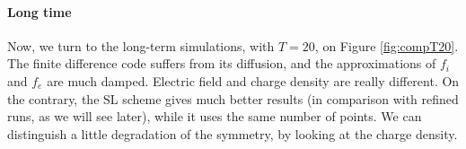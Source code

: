 \documentclass{article}
\numberwithin{equation}{section}
\begin{document}

\paragraph{Long time}

Now, we turn to the long-term simulations, with $T=20$, on Figure \ref{fig:compT20}.  %
%
The finite difference code suffers from its diffusion, and the approximations of $f_i$ and $f_e$ are much damped. Electric field and charge density are really different.
On the contrary, the SL scheme gives much better results (in comparison with refined runs, as we will see later), while it uses the same number of points. We can distinguish a little degradation of the symmetry, by looking at the charge density.
%
\end{document}
